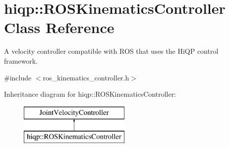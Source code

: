 \hypertarget{classhiqp_1_1ROSKinematicsController}{\section{hiqp\-:\-:R\-O\-S\-Kinematics\-Controller Class Reference}
\label{classhiqp_1_1ROSKinematicsController}
}


A velocity controller compatible with R\-O\-S that uses the Hi\-Q\-P control framework.  




{\ttfamily \#include $<$ros\-\_\-kinematics\-\_\-controller.\-h$>$}

Inheritance diagram for hiqp\-:\-:R\-O\-S\-Kinematics\-Controller\-:\begin{figure}[H]
\begin{center}
\leavevmode
\includegraphics[height=2.000000cm]{classhiqp_1_1ROSKinematicsController}
\end{center}
\end{figure}
